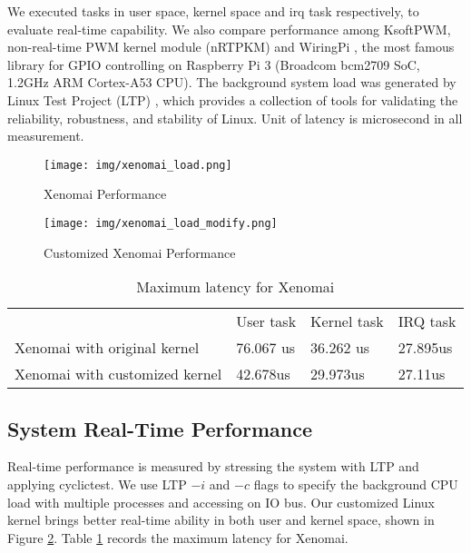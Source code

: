\begin{spacing}{2.0}

We executed tasks in user space, kernel space and irq task respectively, to evaluate real-time capability. We also compare performance among KsoftPWM, non-real-time PWM kernel module (nRTPKM) and WiringPi \cite{WiringPi}, the most famous library for GPIO controlling on Raspberry Pi 3 (Broadcom bcm2709 SoC, 1.2GHz ARM Cortex-A53 CPU). The background system load was generated by Linux Test Project (LTP) \cite{LTP}, which provides a collection of tools for validating the reliability, robustness, and stability of Linux. Unit of latency is microsecond in all measurement.

\begin{figure}	
	\centering
	\texttt{[image: img/xenomai\_load.png]}
	\caption{Xenomai Performance}
	\label{fig:xeno_perf}
\end{figure}

\begin{figure}
	\centering
	\texttt{[image: img/xenomai\_load\_modify.png]}
	\caption{Customized Xenomai Performance}
	\label{fig:xeno_perf_modify}
\end{figure}

\begin{table}[]
\centering
\caption{Maximum latency for Xenomai}
\label{xeno_compare}
\begin{tabular}{llll}
                              & User task & Kernel task & IRQ task \\
Xenomai with original kernel  & 76.067 us & 36.262 us   & 27.895us \\
Xenomai with customized kernel & 42.678us  & 29.973us    & 27.11us 
\end{tabular}
\end{table}

\subsection{System Real-Time Performance}

Real-time performance is measured by stressing the system with LTP and applying cyclictest. \cite{cyclictest} We use LTP $-i$ and $-c$ flags to specify the background CPU load with multiple processes and accessing on IO bus. Our customized Linux kernel brings better real-time ability in both user and kernel space, shown in Figure \ref{fig:xeno_perf_modify}. Table \ref{xeno_compare} records the maximum latency for Xenomai.


\end{spacing}
